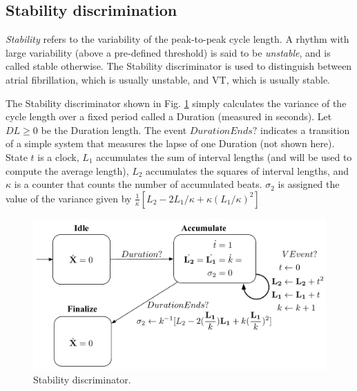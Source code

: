 \subsection{Stability discrimination}
\label{sec:stability}
\emph{Stability} refers to the variability of the peak-to-peak cycle length.
A rhythm with large variability (above a pre-defined threshold) is said to be \emph{unstable}, and is called stable otherwise.
The Stability discriminator is used to distinguish between atrial fibrillation, which is usually unstable, and \ac{VT}, which is usually stable.

The Stability discriminator shown in Fig. \ref{fig:Hstab} simply calculates the variance of the cycle length over a fixed period called a Duration (measured in seconds).
Let $DL \geq 0$ be the Duration length.
The event $DurationEnds?$ indicates a transition of a simple system that measures the lapse of one Duration (not shown here).
State $t$ is a clock, $L_1$ accumulates the sum of interval lengths (and will be used to compute the average length), 
$L_2$ accumulates the squares of interval lengths,
and $\kappa$ is a counter that counts the number of accumulated beats.
$\sigma_2$ is assigned the value of the variance given by $\frac{1}{\kappa}[L_2 - 2L_1/\kappa + \kappa(L_1/\kappa)^2]$
\begin{figure}[t]
	\centering
	\includegraphics[scale=0.3]{figures/stability1v2}
	\vspace{-10pt}
	\caption{Stability discriminator.}
	\vspace{-10pt}
	\label{fig:Hstab}
\end{figure}

